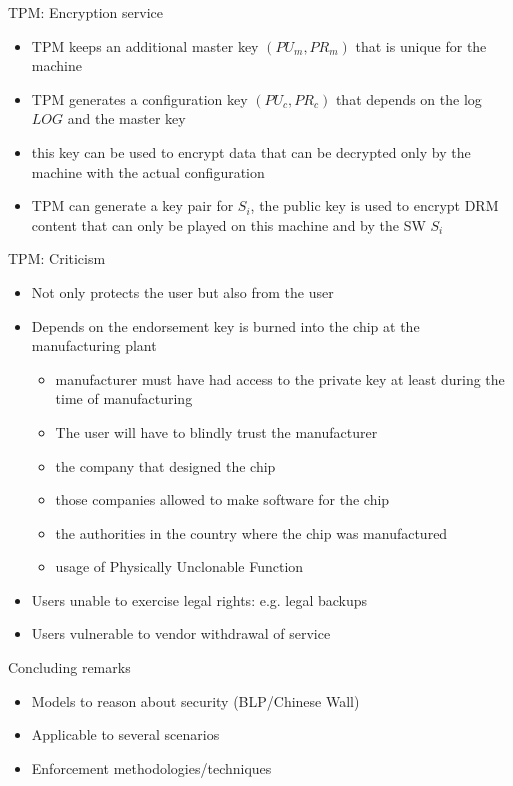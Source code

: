 \documentclass{beamer}
\begin{document}
\begin{frame}{TPM: Encryption service}
  \begin{itemize}
  \item TPM keeps an additional master key $(PU_m, PR_m)$ that is
    unique for the machine 
  \item TPM generates a configuration key $(PU_c, PR_c)$ that depends
    on the log $LOG$ and the master key
  \item this key can be used to encrypt data that can be decrypted
    only by the machine with the actual configuration
  \item TPM can generate a key pair for $S_i$, the public key is used
    to encrypt DRM content that can only be played on this machine and
    by the SW $S_i$
  \end{itemize}
\end{frame}


\begin{frame}{TPM: Criticism}
  \begin{itemize}
    \item Not only protects the user but also from the user
    \item Depends on the endorsement key is burned into the
      chip at the manufacturing plant
      
      \begin{itemize}
      \item manufacturer must have had access to the private key at least
        during the time of manufacturing
      \item The user
        will have to blindly trust the manufacturer
      \item  the company that
        designed the chip
      \item those companies allowed to make software
        for the chip
      \item the authorities
      in the country where the chip was manufactured
      \item usage of Physically Unclonable Function
      \end{itemize}
      
    \item Users unable to exercise legal rights: e.g. legal backups
    \item Users vulnerable to vendor withdrawal of service
  \end{itemize}
\end{frame}

\begin{frame}{Concluding remarks}
  \begin{itemize}
    \item Models to reason about security (BLP/Chinese Wall)
    \item Applicable to several scenarios
    \item Enforcement methodologies/techniques
  \end{itemize}
\end{frame}
\end{document}
